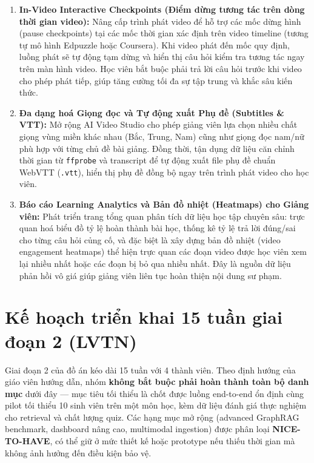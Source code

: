 \begin{enumerate}
    \item \textbf{In-Video Interactive Checkpoints (Điểm dừng tương tác trên dòng thời gian video):}
          Nâng cấp trình phát video để hỗ trợ các mốc dừng hình (pause checkpoints)
          tại các mốc thời gian xác định trên video timeline (tương tự mô hình
          Edpuzzle hoặc Coursera). Khi video phát đến mốc quy định, luồng phát sẽ
          tự động tạm dừng và hiển thị câu hỏi kiểm tra tương tác ngay trên màn
          hình video. Học viên bắt buộc phải trả lời câu hỏi trước khi video cho
          phép phát tiếp, giúp tăng cường tối đa sự tập trung và khắc sâu kiến thức.
    \item \textbf{Đa dạng hoá Giọng đọc và Tự động xuất Phụ đề (Subtitles \& VTT):}
          Mở rộng AI Video Studio cho phép giảng viên lựa chọn nhiều chất giọng
          vùng miền khác nhau (Bắc, Trung, Nam) cũng như giọng đọc nam/nữ phù hợp
          với từng chủ đề bài giảng. Đồng thời, tận dụng dữ liệu căn chỉnh thời
          gian từ \texttt{ffprobe} và transcript để tự động xuất file phụ đề chuẩn
          WebVTT (\texttt{.vtt}), hiển thị phụ đề đồng bộ ngay trên trình phát video
          cho học viên.
    \item \textbf{Báo cáo Learning Analytics và Bản đồ nhiệt (Heatmaps) cho Giảng viên:}
          Phát triển trang tổng quan phân tích dữ liệu học tập chuyên sâu: trực
          quan hoá biểu đồ tỷ lệ hoàn thành bài học, thống kê tỷ lệ trả lời đúng/sai
          cho từng câu hỏi củng cố, và đặc biệt là xây dựng bản đồ nhiệt (video
          engagement heatmaps) thể hiện trực quan các đoạn video được học viên xem
          lại nhiều nhất hoặc các đoạn bị bỏ qua nhiều nhất. Đây là nguồn dữ liệu
          phản hồi vô giá giúp giảng viên liên tục hoàn thiện nội dung sư phạm.
\end{enumerate}

\section{Kế hoạch triển khai 15 tuần giai đoạn 2 (LVTN)}
\label{sec:plan-gd2}

Giai đoạn 2 của đồ án kéo dài 15 tuần với 4 thành viên. Theo định hướng
của giáo viên hướng dẫn, nhóm \textbf{không bắt buộc phải hoàn thành toàn
bộ danh mục} dưới đây --- mục tiêu tối thiểu là chốt được luồng
end-to-end ổn định cùng pilot tối thiểu 10 sinh viên trên một môn học,
kèm dữ liệu đánh giá thực nghiệm cho retrieval và chất lượng quiz. Các
hạng mục mở rộng (advanced GraphRAG benchmark, dashboard nâng cao,
multimodal ingestion) được phân loại \textbf{NICE-TO-HAVE}, có thể giữ
ở mức thiết kế hoặc prototype nếu thiếu thời gian mà không ảnh hưởng
đến điều kiện bảo vệ.

